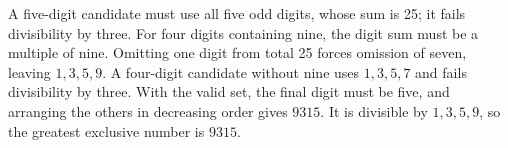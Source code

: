 A five-digit candidate must use all five odd digits, whose sum is 25; it fails divisibility by three. For four digits containing nine, the digit sum must be a multiple of nine. Omitting one digit from total 25 forces omission of seven, leaving $1,3,5,9$. A four-digit candidate without nine uses $1,3,5,7$ and fails divisibility by three. With the valid set, the final digit must be five, and arranging the others in decreasing order gives $9315$. It is divisible by $1,3,5,9$, so the greatest exclusive number is $\boxed{9315}$.

